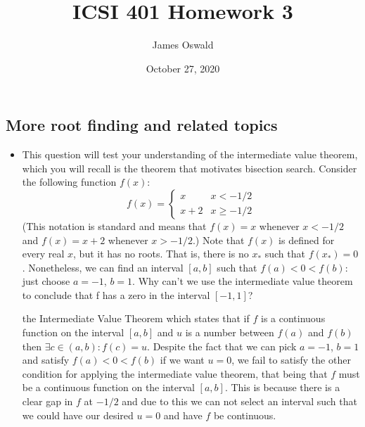 \documentclass{article}
\author{James Oswald}
\date{October 27, 2020}
\title{ICSI 401 Homework 3}
\begin{document}
\maketitle
\thispagestyle{fancy}
\addtocounter{section}{3}
\subsection{More root finding and related topics}
\begin{itemize}
    \item This question will test your understanding of the intermediate value theorem, which you will recall is the theorem that motivates bisection search. Consider the following function $f(x)$:
    \[f(x) = \begin{cases} x & x< -1/2 \\ x + 2 & x\geq-1/2 \end{cases}\]
    (This notation is standard and means that $f(x) = x$ whenever $x < −1/2$ and $f(x) = x + 2$ whenever $x > −1/2$.) Note that $f(x)$ is defined for every real $x$, but it has no roots. That is, there is no $x_*$ such that $f(x_*) = 0$. Nonetheless, we can find an interval $[a, b]$ such that $f(a) < 0 < f(b)$: just choose $a = -1$, $b = 1$. Why can’t we use the intermediate value theorem to conclude that f has a zero in the interval $[−1, 1]$?\newline
    
    the Intermediate Value Theorem which states that if $f$ is a continuous function on the interval $[a, b]$ and $u$ is a number between $f(a)$ and $f(b)$ then $\exists c \in (a, b): f(c) = u$. Despite the fact that we can pick $a = -1$, $b = 1$ and satisfy $f(a) < 0 < f(b)$ if we want $u = 0$, we fail to satisfy the other condition for applying the intermediate value theorem, that being that $f$ must be a continuous function on the interval $[a, b]$. This is because there is a clear gap in $f$ at $-1/2$ and due to this we can not select an interval such that we could have our desired $u = 0$ and have $f$ be continuous. 
    

\end{itemize}
\end{document}
